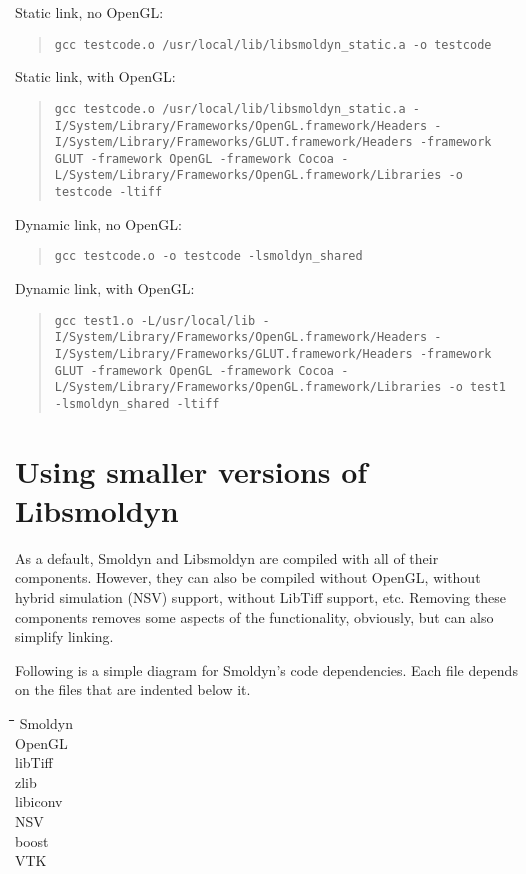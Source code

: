 \documentclass {book}
\begin{document}
Static link, no OpenGL:
\begin{quote}
\lstinline{gcc testcode.o /usr/local/lib/libsmoldyn_static.a -o testcode}
\end{quote}

Static link, with OpenGL:
\begin{quote}
\lstinline{gcc testcode.o /usr/local/lib/libsmoldyn_static.a -I/System/Library/Frameworks/OpenGL.framework/Headers -I/System/Library/Frameworks/GLUT.framework/Headers -framework GLUT -framework OpenGL -framework Cocoa -L/System/Library/Frameworks/OpenGL.framework/Libraries -o testcode -ltiff}
\end{quote}

Dynamic link, no OpenGL:
\begin{quote}
\lstinline{gcc testcode.o -o testcode -lsmoldyn_shared}
\end{quote}

Dynamic link, with OpenGL:
\begin{quote}
\lstinline{gcc test1.o -L/usr/local/lib -I/System/Library/Frameworks/OpenGL.framework/Headers -I/System/Library/Frameworks/GLUT.framework/Headers -framework GLUT -framework OpenGL -framework Cocoa -L/System/Library/Frameworks/OpenGL.framework/Libraries -o test1 -lsmoldyn_shared -ltiff}
\end{quote}

\section{Using smaller versions of Libsmoldyn}

As a default, Smoldyn and Libsmoldyn are compiled with all of their components. However, they can also be compiled without OpenGL, without hybrid simulation (NSV) support, without LibTiff support, etc. Removing these components removes some aspects of the functionality, obviously, but can also simplify linking.

Following is a simple diagram for Smoldyn's code dependencies. Each file depends on the files that are indented below it.

\begin{tabbing}
\hspace{0.25in}\=\hspace{0.25in}\=\hspace{0.25in}\=\hspace{0.25in}\=\hspace{0.25in}\=\kill
\>Smoldyn\\
\>\>OpenGL\\
\>\>libTiff\\
\>\>zlib\\
\>\>libiconv\\
\>\>NSV\\
\>\>\>boost\\
\>\>\>VTK\\
\end{tabbing}
\end{document}
